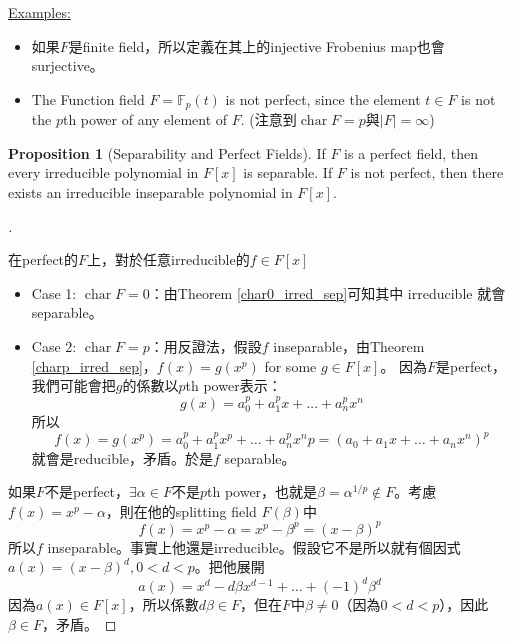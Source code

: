 \documentclass[12pt]{article}
\theoremstyle{definition}
\newcommand{\ex}{\noindent\underline{Examples:}}
\newtheorem{dfn}{Definition}
\newtheorem{prop}{Proposition}
\newenvironment{proofs}[1][\proofname]{%
  \begin{proof}[#1]$ $\par\nobreak\ignorespaces
}{%
  \end{proof}
}
\newcommand{\FF}{\mathbb F}
\DeclareMathOperator{\Char}{char}
\begin{document}
\ex

\begin{itemize}
	\item 如果$F$是finite field，所以定義在其上的injective Frobenius map也會surjective。
	\item The Function field $F=\FF_p(t)$ is not perfect, since the element $t\in F$ is not the $p$th power of any element of $F$. (注意到$\Char F=p$與$|F|=\infty$)
\end{itemize}

\begin{prop}[Separability and Perfect Fields]
	If $F$ is a perfect field, then every irreducible polynomial in $F[x]$ is separable.
	If $F$ is not perfect, then there exists an irreducible inseparable polynomial in $F[x]$.
\end{prop}

\begin{proofs}
	在perfect的$F$上，對於任意irreducible的$f\in F[x]$
	\begin{itemize}
		\item Case 1: $\Char F=0$：由Theorem \ref{char0_irred_sep}可知其中 irreducible 就會 separable。
		\item Case 2: $\Char F=p$：用反證法，假設$f$ inseparable，由Theorem \ref{charp_irred_sep}，$f(x)=g(x^p)$ for some $g\in F[x]$。
		      因為$F$是perfect，我們可能會把$g$的係數以$p$th power表示：
		      \[g(x)=a_0^p+a_1^p x+\dots+a_n^p x^n\]
		      所以
		      \[f(x)=g(x^p)=a_0^p+a_1^p x^p +\dots + a_n^p x^np=(a_0+a_1x+\dots+a_n x^n)^p\]
		      就會是reducible，矛盾。於是$f$ separable。
	\end{itemize}

	如果$F$不是perfect，$\exists \alpha\in F$不是$p$th power，也就是$\beta=\alpha^{1/p}\notin F$。考慮$f(x)=x^p-\alpha$，則在他的splitting field $F(\beta)$中
	\[f(x)=x^p-\alpha=x^p-\beta^p=(x-\beta)^p\]
	所以$f$ inseparable。事實上他還是irreducible。假設它不是所以就有個因式$a(x)=(x-\beta)^d, 0<d<p$。把他展開
	\[a(x)=x^d-d\beta x^{d-1}+\dots+(-1)^d\beta^d\]
	因為$a(x)\in F[x]$，所以係數$d\beta\in F$，但在$F$中$\beta\neq 0$（因為$0<d<p$），因此$\beta \in F$，矛盾。
\end{proofs}


\end{document}
